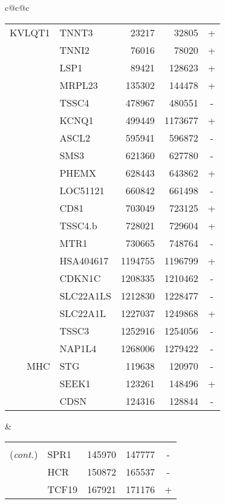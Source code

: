 \begin{tabular}{c@{\quad}c@{\quad}c}
\begin{tabular}[t]{|r|lrrc|}
\hline
  KVLQT1 & TNNT3      &    23217 &    32805 & + \\
         & TNNI2      &    76016 &    78020 & + \\
         & LSP1       &    89421 &   128623 & + \\
         & MRPL23     &   135302 &   144478 & + \\
         & TSSC4      &   478967 &   480551 & - \\
         & KCNQ1      &   499449 &  1173677 & + \\
         & ASCL2      &   595941 &   596872 & - \\
         & SMS3       &   621360 &   627780 & - \\
         & PHEMX      &   628443 &   643862 & + \\
         & LOC51121   &   660842 &   661498 & - \\
         & CD81       &   703049 &   723125 & + \\
         & TSSC4.b    &   728021 &   729604 & + \\
         & MTR1       &   730665 &   748764 & - \\
         & HSA404617  &  1194755 &  1196799 & + \\
         & CDKN1C     &  1208335 &  1210462 & - \\
         & SLC22A1LS  &  1212830 &  1228477 & - \\
         & SLC22A1L   &  1227037 &  1249868 & + \\
         & TSSC3      &  1252916 &  1254056 & - \\
         & NAP1L4     &  1268006 &  1279422 & - \\
\hline
     MHC & STG        &   119638 &   120970 & - \\
         & SEEK1      &   123261 &   148496 & + \\
         & CDSN       &   124316 &   128844 & - \\
\hline
\end{tabular}
 &
\begin{tabular}[t]{|r|lrrc|}
\hline
\lb{1cm}{r}{SEQ} & \lb{1.5cm}{l}{GENE} & \lb{1cm}{r}{START} & \lb{1cm}{r}{END} & \lb{0.5cm}{c}{STR} \\
\hline
\raisebox{-2.25ex}{\shortstack{MHC\\(\textit{cont.})}} & SPR1       &   145970 &   147777 & - \\[-1.75ex]
         & HCR        &   150872 &   165537 & - \\
         & TCF19      &   167921 &   171176 & + \\

\end{tabular}
\end{tabular}
